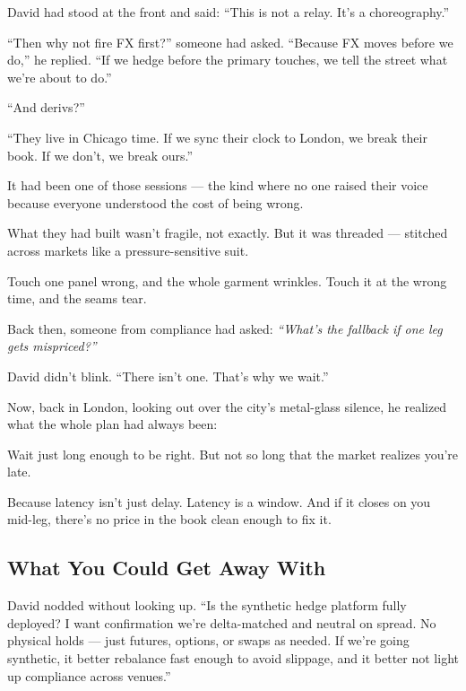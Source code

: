 \medskip

David had stood at the front and said:
“This is not a relay. It’s a choreography.”

“Then why not fire FX first?” someone had asked.
“Because FX moves before we do,” he replied. “If we hedge before the primary touches, we tell the 
street what we’re about to do.”

“And derivs?”

“They live in Chicago time. If we sync their clock to London, we break their book. If we don’t, 
we break ours.”

It had been one of those sessions — the kind where no one raised their voice because everyone 
understood the cost of being wrong.

What they had built wasn’t fragile, not exactly.
But it was threaded — stitched across markets like a pressure-sensitive suit.

Touch one panel wrong, and the whole garment wrinkles.
Touch it at the wrong time, and the seams tear.

Back then, someone from compliance had asked:
\textit{“What’s the fallback if one leg gets mispriced?”}

David didn’t blink.
“There isn’t one. That’s why we wait.”

Now, back in London, looking out over the city’s metal-glass silence,
he realized what the whole plan had always been:

Wait just long enough to be right.
But not so long that the market realizes you’re late.

Because latency isn’t just delay.
Latency is a window.
And if it closes on you mid-leg,
there’s no price in the book clean enough to fix it.





\subsection{What You Could Get Away With}


David nodded without looking up.
``Is the synthetic hedge platform fully deployed? I want confirmation we’re delta-matched and 
neutral on spread. No physical holds — just futures, options, or swaps as needed. If we’re going 
synthetic, it better rebalance fast enough to avoid slippage, and it better not light up 
compliance across venues.''

\medskip

